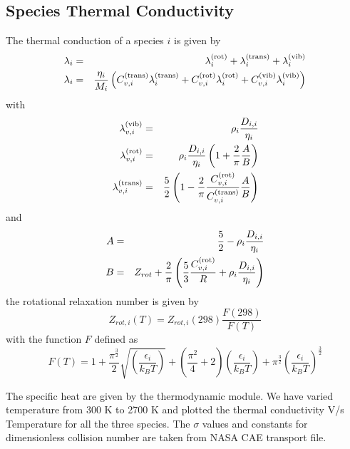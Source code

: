 \subsection{Species Thermal Conductivity}

The thermal conduction of a species $i$ is given by
\begin{eqnarray*}
\lambda_i &=& \lambda_i^{(\textnormal{rot})} + \lambda_i^{(\textnormal{trans})} + \lambda_i^{(\textnormal{vib})} \\
\lambda_i &=& \frac{\eta_i}{M_i} \left(
                        C_{v,i}^{(\textnormal{trans})} \lambda_i^{(\textnormal{trans})} + C_{v,i}^{(\textnormal{rot})} \lambda_i^{(\textnormal{rot})}+ C_{v,i}^{(\textnormal{vib})}  \lambda_i^{(\textnormal{vib})} 
                                          \right)
\end{eqnarray*}
with
\begin{eqnarray*}
\lambda_{v,i}^{(\textnormal{vib})}   & =& \rho_i \frac{D_{i,i}}{\eta_i} \\
\lambda_{v,i}^{(\textnormal{rot})}   & =& \rho_i \frac{D_{i,i}}{\eta_i}\left(1 + \frac{2}{\pi}\frac{A}{B}\right) \\
\lambda_{v,i}^{(\textnormal{trans})}   & =&  \frac{5}{2} \left(1 - \frac{2}{\pi}\frac{C_{v,i}^{(\textnormal{rot})}}{C_{v,i}^{(\textnormal{trans})}}\frac{A}{B}\right)
\end{eqnarray*}
%
and
%
\begin{eqnarray*}
  A & = & \frac{5}{2} -  \rho_i \frac{D_{i,i}}{\eta_i}  \\
  B & = & Z_{rot} + \frac{2}{\pi} \left(\frac{5}{3}\frac{C_{v,i}^{(\textnormal{rot})}}{R} + \rho_i \frac{D_{i,i}}{\eta_i}\right)
\end{eqnarray*}
%
\noindent the rotational relaxation number is given by
\begin{equation}
Z_{rot,i}(T) = Z_{rot,i}(298)\frac{F(298)}{F(T)}
\label{thermal_cond:Zrot}
\end{equation}
\noindent with the function $F$ defined as
\begin{equation}
F(T) = 1 + \frac{\pi^{\frac{3}{2}}}{2}\sqrt{\left(\frac{\epsilon_i}{k_B T}\right)}
         + \left(\frac{\pi^2}{4} + 2\right)\left(\frac{\epsilon_i}{k_B T}\right)
         + \pi^{\frac{3}{2}}\left(\frac{\epsilon_i}{k_B T}\right)^{\frac{3}{2}}
\end{equation}

\noindent The specific heat are given by the thermodynamic module.  We have varied temperature from 300 K to 2700 K and plotted the thermal conductivity V/s Temperature for all the  three species. The $\sigma$ values and constants for dimensionless collision number are taken from NASA CAE transport file.


